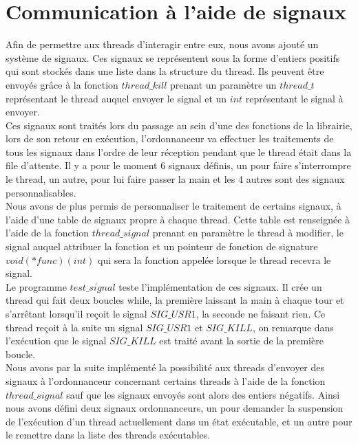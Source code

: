 \section{Communication à l'aide de signaux}
	Afin de permettre aux threads d'interagir entre eux, nous
        avons ajouté un système de signaux.  Ces signaux se
        représentent sous la forme d'entiers positifs qui sont stockés
        dans une liste dans la structure du thread. Ils peuvent être
        envoyés grâce à la fonction $thread\_kill$ prenant un
        paramètre un $thread\_t$ représentant le thread auquel envoyer
        le signal et un $int$ représentant le signal à envoyer.\\
	
	Ces signaux sont traités lors du passage au sein d'une des
        fonctions de la librairie, lors de son retour en exécution,
        l'ordonnanceur va effectuer les traitements de tous les
        signaux dans l'ordre de leur réception pendant que le thread
        était dans la file d'attente. Il y a pour le moment 6 signaux
        définis, un pour faire s'interrompre le thread, un autre, pour
        lui faire passer la main et les 4 autres sont des signaux
        personnalisables.\\
	
	Nous avons de plus permis de personnaliser le traitement de
        certains signaux, à l'aide d'une table de signaux propre à
        chaque thread. Cette table est renseignée à l'aide de la
        fonction $thread\_signal$ prenant en paramètre le thread à
        modifier, le signal auquel attribuer la fonction et un
        pointeur de fonction de signature $void(*func)(int)$ qui sera
        la fonction appelée lorsque le thread recevra le signal.\\
	
	Le programme $test\_signal$ teste l'implémentation de ces
        signaux. Il crée un thread qui fait deux boucles while, la
        première laissant la main à chaque tour et s'arrêtant
        lorsqu'il reçoit le signal $SIG\_USR1$, la seconde ne faisant
        rien. Ce thread reçoit à la suite un signal $SIG\_USR1$ et
        $SIG\_KILL$, on remarque dans l'exécution que le signal
        $SIG\_KILL$ est traité avant la sortie de la première
        boucle.\\


	Nous avons par la suite implémenté la possibilité aux threads
        d'envoyer des signaux à l'ordonnanceur concernant certains
        threads à l'aide de la fonction $thread\_signal$ sauf que les
        signaux envoyés sont alors des entiers négatifs. Ainsi nous
        avons défini deux signaux ordonnanceurs, un pour demander la
        suspension de l'exécution d'un thread actuellement dans un
        état exécutable, et un autre pour le remettre dans la liste
        des threads exécutables.\\
	
